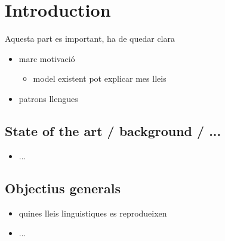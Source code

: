 \chapter{Introduction}
Aquesta part es important, ha de quedar clara
\begin{itemize}
\item marc motivació
  \begin{itemize}
  \item model existent pot explicar mes lleis
  \end{itemize}
\item patrons llengues
\end{itemize}
\section{State of the art / background / ...}
\begin{itemize}
\item ...
\end{itemize}
\section{Objectius generals}
\begin{itemize}
\item quines lleis linguistiques es reprodueixen
\item ...
\end{itemize}
